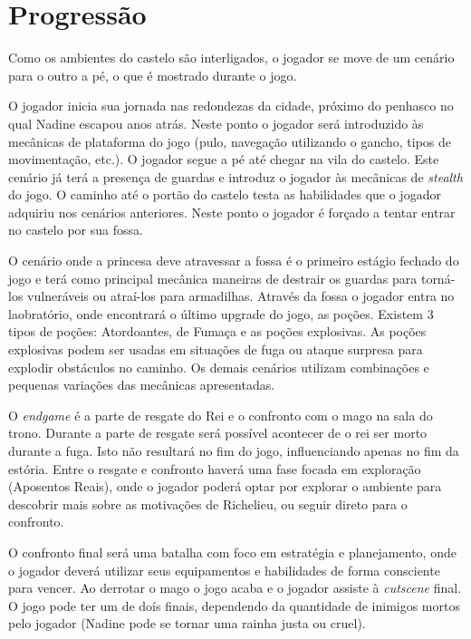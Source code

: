 \section*{Progressão}

Como os ambientes do castelo são interligados, o jogador se move de um cenário para o outro a pé, o que é mostrado durante o jogo.

O jogador inicia sua jornada nas redondezas da cidade, próximo do penhasco no qual Nadine escapou anos atrás. Neste ponto o jogador será introduzido às mecânicas de plataforma do jogo (pulo, navegação utilizando o gancho, tipos de movimentação, etc.). O jogador segue a pé até chegar na vila do castelo. Este cenário já terá a presença de guardas e introduz o jogador às mecânicas de \emph{stealth} do jogo. O caminho até o portão do castelo testa as habilidades que o jogador adquiriu nos cenários anteriores. Neste ponto o jogador é forçado a tentar entrar no castelo por sua fossa.

O cenário onde a princesa deve atravessar a fossa é o primeiro estágio fechado do jogo e terá como principal mecânica maneiras de destrair os guardas para torná-los vulneráveis ou atraí-los para armadilhas. Através da fossa o jogador entra no laobratório, onde encontrará o último upgrade do jogo, as poções. Existem 3 tipos de poções: Atordoantes, de Fumaça e as poções explosivas. As poções explosivas podem ser usadas em situações de fuga ou ataque surpresa para explodir obstáculos no caminho. Os demais cenários utilizam combinações e pequenas variações das mecânicas apresentadas.


O \emph{endgame} é a parte de resgate do Rei e o confronto com o mago na sala do trono. Durante a parte de resgate será possível acontecer de o rei ser morto durante a fuga. Isto não resultará no fim do jogo, influenciando apenas no fim da estória. Entre o resgate e confronto haverá uma fase focada em exploração (Aposentos Reais), onde o jogador poderá optar por explorar o ambiente para descobrir mais sobre as motivações de Richelieu, ou seguir direto para o confronto.

	\vspace{2cm}

		\let\cleardoublepage\clearpage
		

O confronto final será uma batalha com foco em estratégia e planejamento, onde o jogador deverá utilizar seus equipamentos e habilidades de forma consciente para vencer. Ao derrotar o mago o jogo acaba e o jogador assiste à \emph{cutscene} final. O jogo pode ter um de doís finais, dependendo da quantidade de inimigos mortos pelo jogador (Nadine pode se tornar uma rainha justa ou cruel).


